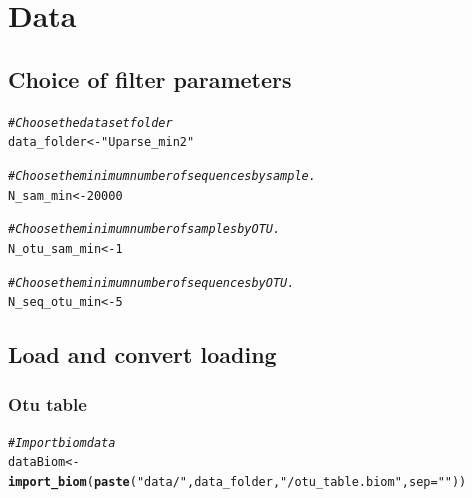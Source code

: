 \documentclass[12pt]{article}\usepackage[]{graphicx}\usepackage[]{color}
\makeatletter
\newcommand{\hlnum}[1]{\textcolor[rgb]{0.686,0.059,0.569}{#1}}%
\newcommand{\hlstr}[1]{\textcolor[rgb]{0.192,0.494,0.8}{#1}}%
\newcommand{\hlcom}[1]{\textcolor[rgb]{0.678,0.584,0.686}{\textit{#1}}}%
\newcommand{\hlstd}[1]{\textcolor[rgb]{0.345,0.345,0.345}{#1}}%
\newcommand{\hlkwb}[1]{\textcolor[rgb]{0.69,0.353,0.396}{#1}}%
\newcommand{\hlkwc}[1]{\textcolor[rgb]{0.333,0.667,0.333}{#1}}%
\newcommand{\hlkwd}[1]{\textcolor[rgb]{0.737,0.353,0.396}{\textbf{#1}}}%
\newenvironment{kframe}{%
 \def\at@end@of@kframe{}%
 \ifinner\ifhmode%
  \def\at@end@of@kframe{\end{minipage}}%
  \begin{minipage}{\columnwidth}%
 \fi\fi%
 \def\FrameCommand##1{\hskip\@totalleftmargin \hskip-\fboxsep
 \colorbox{shadecolor}{##1}\hskip-\fboxsep
     \hskip-\linewidth \hskip-\@totalleftmargin \hskip\columnwidth}%
 \MakeFramed {\advance\hsize-\width
   \@totalleftmargin\z@ \linewidth\hsize
   \@setminipage}}%
 {\par\unskip\endMakeFramed%
 \at@end@of@kframe}
\newenvironment{knitrout}{}{} %
\numberwithin{figure}{section}
\makeatother
\begin{document}
\section{Data}

  \subsection{Choice of filter parameters}
  \label{section:filter}
\begin{knitrout}\small
{}\color{fgcolor}\begin{kframe}
\begin{alltt}
\hlcom{#Choose the dataset folder}
\hlstd{data_folder} \hlkwb{<-} \hlstr{"Uparse_min2"}

\hlcom{#Choose the minimum number of sequences by sample.}
\hlstd{N_sam_min} \hlkwb{<-} \hlnum{20000}

\hlcom{#Choose the minimum number of samples by OTU.}
\hlstd{N_otu_sam_min} \hlkwb{<-} \hlnum{1}

\hlcom{#Choose the minimum number of sequences by OTU.}
\hlstd{N_seq_otu_min} \hlkwb{<-} \hlnum{5}
\end{alltt}
\end{kframe}
\end{knitrout}


  \subsection{Load and convert loading}
  \subsubsection{Otu table}
\begin{knitrout}\small
{}\color{fgcolor}\begin{kframe}
\begin{alltt}
\hlcom{#Import biom data}
\hlstd{dataBiom}   \hlkwb{<-} \hlkwd{import_biom}\hlstd{(}\hlkwd{paste}\hlstd{(}\hlstr{"data/"}\hlstd{, data_folder,} \hlstr{"/otu_table.biom"}\hlstd{,} \hlkwc{sep}\hlstd{=}\hlstr{""}\hlstd{))}
\end{alltt}
\end{kframe}
\end{knitrout}
\end{document}
